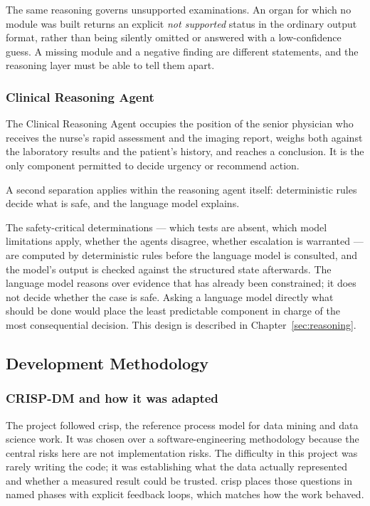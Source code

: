 The same reasoning governs unsupported examinations. An organ for which no module was
built returns an explicit \textit{not supported} status in the ordinary output format,
rather than being silently omitted or answered with a low-confidence guess. A missing
module and a negative finding are different statements, and the reasoning layer must be
able to tell them apart.

\subsubsection{Clinical Reasoning Agent}

The Clinical Reasoning Agent occupies the position of the senior physician who receives
the nurse's rapid assessment and the imaging report, weighs both against the laboratory
results and the patient's history, and reaches a conclusion. It is the only component
permitted to decide urgency or recommend action.

\begin{keystatement}
A second separation applies within the reasoning agent itself: deterministic rules decide
what is safe, and the language model explains.
\end{keystatement}

The safety-critical determinations --- which tests are absent, which model limitations
apply, whether the agents disagree, whether escalation is warranted --- are computed by
deterministic rules before the language model is consulted, and the model's output is
checked against the structured state afterwards. The language model reasons over evidence
that has already been constrained; it does not decide whether the case is safe. Asking a
language model directly what should be done would place the least predictable component in
charge of the most consequential decision. This design is described in
Chapter~\ref{sec:reasoning}.

\subsection{Development Methodology}
\label{subsec:methodology}

\subsubsection{CRISP-DM and how it was adapted}

The project followed \gls{crisp}, the reference process model for data mining and data
science work. It was chosen over a software-engineering methodology because the central
risks here are not implementation risks. The difficulty in this project was rarely writing
the code; it was establishing what the data actually represented and whether a measured
result could be trusted. \gls{crisp} places those questions in named phases with explicit
feedback loops, which matches how the work behaved.

